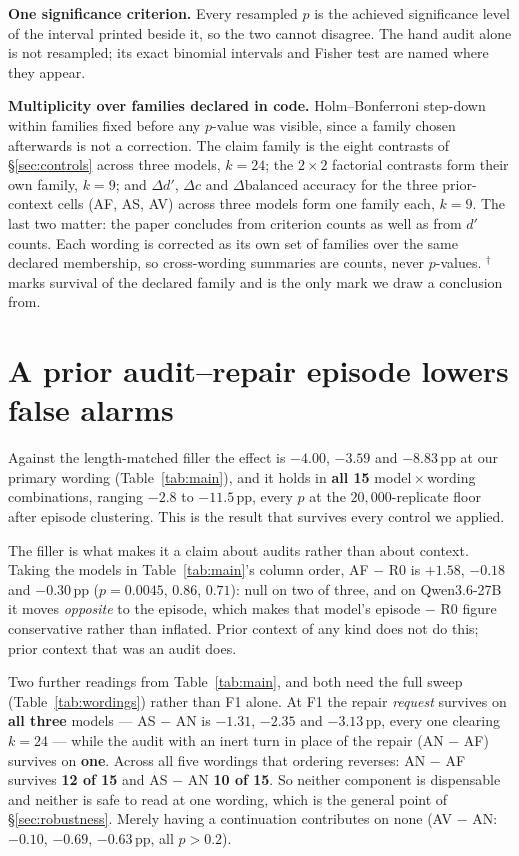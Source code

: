 \documentclass[11pt]{article}
\newcommand{\pp}{\,\text{pp}}
\newcommand{\holm}{$^{\dagger}$}
\begin{document}
\textbf{One significance criterion.} Every resampled $p$ is the achieved significance level of the
interval printed beside it, so the two cannot disagree. The hand audit alone is not resampled; its
exact binomial intervals and Fisher test are named where they appear.

\textbf{Multiplicity over families declared in code.} Holm--Bonferroni step-down within families fixed
before any $p$-value was visible, since a family chosen afterwards is not a correction. The claim
family is the eight contrasts of \S\ref{sec:controls} across three models, $k=24$; the $2\times2$
factorial contrasts form their own family, $k=9$; and $\Delta d'$, $\Delta c$ and $\Delta$balanced
accuracy for the three prior-context cells (AF, AS, AV) across three models form one family each,
$k=9$. The last two matter: the paper
concludes from criterion counts as well as from $d'$ counts. Each wording is corrected as its own
set of families over the same declared membership, so cross-wording summaries are counts, never
$p$-values. \holm{} marks survival of the declared family and is the only mark we draw a conclusion
from.

\section{A prior audit--repair episode lowers false alarms}
\label{sec:effect}

Against the length-matched filler the effect is $-4.00$, $-3.59$ and $-8.83\pp$ at our primary wording
(Table~\ref{tab:main}), and it holds in \textbf{all 15} model\,$\times$\,wording combinations, ranging
$-2.8$ to $-11.5\pp$, every $p$ at the $20{,}000$-replicate floor after episode clustering. This is the result that
survives every control we applied.

The filler is what makes it a claim about audits rather than about context. Taking the models in
Table~\ref{tab:main}'s column order, AF $-$ R0 is $+1.58$, $-0.18$ and $-0.30\pp$
($p = 0.0045$, $0.86$, $0.71$): null on two of three, and on Qwen3.6-27B it moves \emph{opposite} to the
episode, which makes that model's episode $-$ R0 figure conservative rather than inflated. Prior context
of any kind does not do this; prior context that was an audit does.

Two further readings from Table~\ref{tab:main}, and both need the full sweep
(Table~\ref{tab:wordings}) rather than F1 alone. At F1 the repair \emph{request} survives on
\textbf{all three} models --- AS $-$ AN is $-1.31$, $-2.35$ and $-3.13\pp$, every one clearing $k=24$
--- while the audit with an inert turn in place of the repair (AN $-$ AF) survives on \textbf{one}.
Across all five wordings that ordering reverses: AN $-$ AF survives \textbf{12 of 15} and AS $-$ AN
\textbf{10 of 15}. So neither component is dispensable and neither is safe to read at one wording,
which is the general point of \S\ref{sec:robustness}. Merely having
a continuation contributes on none (AV $-$ AN: $-0.10$, $-0.69$, $-0.63\pp$, all $p > 0.2$).
\end{document}
